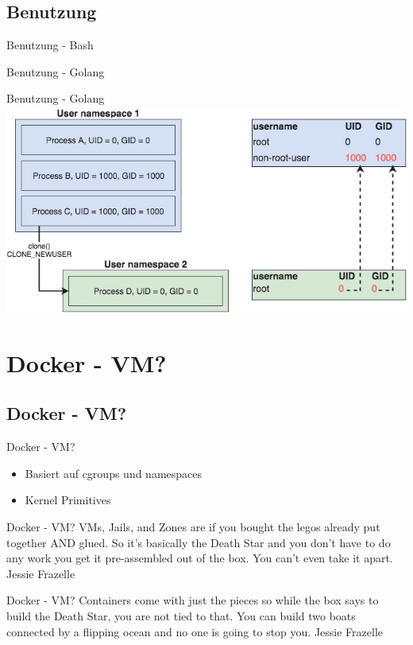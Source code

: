 \documentclass[14pt]{beamer}
\begin{document}
    \subsection{Benutzung}
    \begin{frame}{Benutzung - Bash}
    
    \end{frame}
    
    \begin{frame}{Benutzung - Golang}
    
    \end{frame}
    
    \begin{frame}{Benutzung - Golang}
   	\centering\includegraphics[scale=.4]{logo/user-ns}
    \end{frame}
   
   
    \section{Docker - VM?}
    \subsection{Docker - VM?}
   \begin{frame}{Docker - VM?}
    \begin{itemize}
    \item Basiert auf cgroups und namespaces
    \item Kernel Primitives
    \end{itemize}
    \end{frame}
    
    \begin{frame}{Docker - VM?}
    VMs, Jails, and Zones are if you bought the legos already put together AND glued. So it’s basically the Death Star and you don’t have to do any work you get it pre-assembled out of the box. You can’t even take it apart.
    \tiny Jessie Frazelle
	\end{frame}
    \begin{frame}{Docker - VM?}
Containers come with just the pieces so while the box says to build the Death Star, you are not tied to that. You can build two boats connected by a flipping ocean and no one is going to stop you.
	\tiny Jessie Frazelle
    \end{frame}
   
\end{document}
